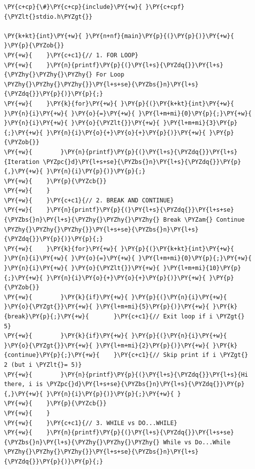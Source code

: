 \begin{Verbatim}[label=\makebox{\url{https://github.com/lucabaldini/cmepda/tree/master/slides/latex/snippets/loops.c}},commandchars=\\\{\}]
\PY{c+cp}{\#}\PY{c+cp}{include}\PY{+w}{ }\PY{c+cpf}{\PYZlt{}stdio.h\PYZgt{}}

\PY{k+kt}{int}\PY{+w}{ }\PY{n+nf}{main}\PY{p}{(}\PY{p}{)}\PY{+w}{ }\PY{p}{\PYZob{}}
\PY{+w}{    }\PY{c+c1}{// 1. FOR LOOP}
\PY{+w}{    }\PY{n}{printf}\PY{p}{(}\PY{l+s}{\PYZdq{}}\PY{l+s}{\PYZhy{}\PYZhy{}\PYZhy{} For Loop \PYZhy{}\PYZhy{}\PYZhy{}}\PY{l+s+se}{\PYZbs{}n}\PY{l+s}{\PYZdq{}}\PY{p}{)}\PY{p}{;}
\PY{+w}{    }\PY{k}{for}\PY{+w}{ }\PY{p}{(}\PY{k+kt}{int}\PY{+w}{ }\PY{n}{i}\PY{+w}{ }\PY{o}{=}\PY{+w}{ }\PY{l+m+mi}{0}\PY{p}{;}\PY{+w}{ }\PY{n}{i}\PY{+w}{ }\PY{o}{\PYZlt{}}\PY{+w}{ }\PY{l+m+mi}{3}\PY{p}{;}\PY{+w}{ }\PY{n}{i}\PY{o}{+}\PY{o}{+}\PY{p}{)}\PY{+w}{ }\PY{p}{\PYZob{}}
\PY{+w}{        }\PY{n}{printf}\PY{p}{(}\PY{l+s}{\PYZdq{}}\PY{l+s}{Iteration \PYZpc{}d}\PY{l+s+se}{\PYZbs{}n}\PY{l+s}{\PYZdq{}}\PY{p}{,}\PY{+w}{ }\PY{n}{i}\PY{p}{)}\PY{p}{;}
\PY{+w}{    }\PY{p}{\PYZcb{}}
\PY{+w}{    }
\PY{+w}{    }\PY{c+c1}{// 2. BREAK AND CONTINUE}
\PY{+w}{    }\PY{n}{printf}\PY{p}{(}\PY{l+s}{\PYZdq{}}\PY{l+s+se}{\PYZbs{}n}\PY{l+s}{\PYZhy{}\PYZhy{}\PYZhy{} Break \PYZam{} Continue \PYZhy{}\PYZhy{}\PYZhy{}}\PY{l+s+se}{\PYZbs{}n}\PY{l+s}{\PYZdq{}}\PY{p}{)}\PY{p}{;}
\PY{+w}{    }\PY{k}{for}\PY{+w}{ }\PY{p}{(}\PY{k+kt}{int}\PY{+w}{ }\PY{n}{i}\PY{+w}{ }\PY{o}{=}\PY{+w}{ }\PY{l+m+mi}{0}\PY{p}{;}\PY{+w}{ }\PY{n}{i}\PY{+w}{ }\PY{o}{\PYZlt{}}\PY{+w}{ }\PY{l+m+mi}{10}\PY{p}{;}\PY{+w}{ }\PY{n}{i}\PY{o}{+}\PY{o}{+}\PY{p}{)}\PY{+w}{ }\PY{p}{\PYZob{}}
\PY{+w}{        }\PY{k}{if}\PY{+w}{ }\PY{p}{(}\PY{n}{i}\PY{+w}{ }\PY{o}{\PYZgt{}}\PY{+w}{ }\PY{l+m+mi}{5}\PY{p}{)}\PY{+w}{ }\PY{k}{break}\PY{p}{;}\PY{+w}{       }\PY{c+c1}{// Exit loop if i \PYZgt{} 5}
\PY{+w}{        }\PY{k}{if}\PY{+w}{ }\PY{p}{(}\PY{n}{i}\PY{+w}{ }\PY{o}{\PYZgt{}}\PY{+w}{ }\PY{l+m+mi}{2}\PY{p}{)}\PY{+w}{ }\PY{k}{continue}\PY{p}{;}\PY{+w}{    }\PY{c+c1}{// Skip print if i \PYZgt{} 2 (but i \PYZlt{}= 5)}
\PY{+w}{        }\PY{n}{printf}\PY{p}{(}\PY{l+s}{\PYZdq{}}\PY{l+s}{Hi there, i is \PYZpc{}d}\PY{l+s+se}{\PYZbs{}n}\PY{l+s}{\PYZdq{}}\PY{p}{,}\PY{+w}{ }\PY{n}{i}\PY{p}{)}\PY{p}{;}\PY{+w}{ }
\PY{+w}{    }\PY{p}{\PYZcb{}}
\PY{+w}{    }
\PY{+w}{    }\PY{c+c1}{// 3. WHILE vs DO...WHILE}
\PY{+w}{    }\PY{n}{printf}\PY{p}{(}\PY{l+s}{\PYZdq{}}\PY{l+s+se}{\PYZbs{}n}\PY{l+s}{\PYZhy{}\PYZhy{}\PYZhy{} While vs Do...While \PYZhy{}\PYZhy{}\PYZhy{}}\PY{l+s+se}{\PYZbs{}n}\PY{l+s}{\PYZdq{}}\PY{p}{)}\PY{p}{;}

\end{Verbatim}
